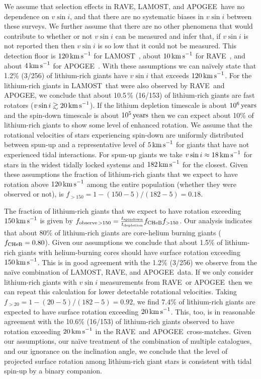 \documentclass[twocolumn]{aastex62}
\newcommand\lamost{LAMOST}
\newcommand\apogee{APOGEE}
\newcommand\rave{RAVE}
\begin{document}
We assume that selection effects in \rave, \lamost, and \apogee\ 
have no dependence on $v\sin{i}$, and that there are no systematic biases in $v\sin{i}$ between these surveys. We further assume that there are no other phenomena that would contribute to whether or not $v\sin{i}$ can be measured and infer that, if $v\sin{i}$ is not reported then then $v\sin{i}$ is  so low that it could not be measured. This detection floor is $120\,{\rm km\,s}^{-1}$ for \lamost\ \citep{Frasca_2016}, about $10\,{\rm km\,s}^{-1}$ for \rave\ \citep{Siebert_2011}, 
and about $4\,{\rm km\,s}^{-1}$ for \apogee\ \citep{Deshpande_2013}.  With these assumptions we can na\"ively state that 1.2\% (3/256) of lithium-rich giants have $v\sin{i}$ that exceeds $120\,{\rm km\,s}^{-1}$. 
For the lithium-rich giants in \lamost\ that were also observed by \rave\ and \apogee,
we conclude that about 10.5\,\% (16/153) of lithium-rich giants are fast rotators ($v\sin{i} \gtrsim 20\,{\rm km\,s}^{-1}$). If the lithium depletion timescale is about $10^6\,{\rm years}$ and the spin-down timescale is about $10^5\,{\rm years}$ \citep{Tout_1992} then we can expect about 10\% of lithium-rich giants to show some level of enhanced rotation. We assume that the rotational velocities of stars experiencing spin-down are uniformly distributed between spun-up and  a representative level of $5\,{\rm km\,s}^{-1}$ for giants that have not experienced tidal interactions. 
For spun-up  giants we take $v\sin{i} \approx 18\,{\rm km\,s}^{-1}$ for stars in the widest tidally locked systems and $182\,{\rm km\,s}^{-1}$ for the closest. 
Given these assumptions the fraction of lithium-rich giants that we expect to have rotation above $120\,{\rm km\,s}^{-1}$  among the entire population (whether they were observed or not), is $f_{>150} = 1 - (150 - 5)/(182 - 5) = 0.18$. 


The fraction of lithium-rich giants that we expect to have rotation exceeding $150\,{\rm km\,s}^{-1}$ is given by $f_{{\rm observe}\,>150} = \frac{t_{\rm spindown}}{t_{\rm depletion}} f_{\rm CHeB} f_{>150}$. Our analysis indicates that about 80\% of lithium-rich giants are core-helium burning giants ($f_{\rm CHeB} = 0.80$). Given our assumptions we conclude that about 1.5\% of lithium-rich giants with helium-burning cores should have surface rotation exceeding $150\,{\rm km\,s}^{-1}$. This is in good agreement with the 1.2\% (3/256) we observe from the na\"ive combination of \lamost, \rave, and \apogee\ data. If we only consider lithium-rich giants with $v\sin{i}$ measurements from \rave\ or \apogee\ then we can repeat this calculation for lower detectable rotational velocities. Taking $f_{>20} = 1 - (20 - 5)/(182 - 5) = 0.92$, we find 7.4\% of lithium-rich giants are expected to have surface rotation exceeding $20\,{\rm km\,s}^{-1}$. This, too, is in reasonable agreement with the 10.6\% (16/153) of lithium-rich giants observed to have rotation exceeding $20\,{\rm km\,s}^{-1}$ in the \rave\ and \apogee\ cross-matches. Given our assumptions,  our na\"ive treatment of the combination of multiple catalogues, and our ignorance on the inclination angle, we conclude that the level of projected surface rotation among lithium-rich giant stars is consistent with tidal spin-up by a binary companion.
\end{document}

